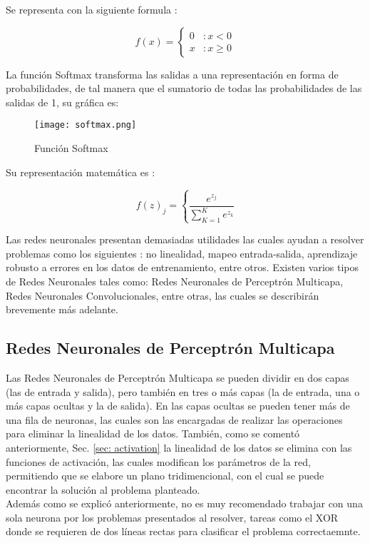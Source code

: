                 Se representa con la siguiente formula \cite{Freire2021}: 

                \[f(x) = \left\{ \begin{array}{lr} 0 & : x < 0\\ x & : x \ge 0 \end{array} \right. \]

                La función Softmax transforma las salidas a una representación en forma de 
                probabilidades, de tal manera que el sumatorio de todas las probabilidades 
                de las salidas de 1, su gr\'afica es: \label{subsec: softmax}

                \begin{figure}[H]
                    \centering
                    \texttt{[image: softmax.png]}
                    \caption{Funci\'on Softmax}
                    \label{fig:fig7}
                \end{figure}

                Su representaci\'on matem\'atica es \cite{calvo-2018}:

                \[f(z)_j = \left\{ \frac{e^{z_j}}{\sum_{K=1}^{K} e^{z_k}} \right. \]

        Las redes neuronales presentan demasiadas utilidades las cuales ayudan a resolver problemas como los 
        siguientes \cite{liu2015}: no linealidad, mapeo entrada-salida, aprendizaje robusto 
        a errores en los datos de entrenamiento, entre otros.  Existen varios tipos de Redes Neuronales tales como: Redes Neuronales de Perceptr\'on 
        Multicapa, Redes Neuronales Convolucionales, entre otras, las cuales se describirán brevemente más adelante.
    
        \subsection{Redes Neuronales de Perceptr\'on Multicapa}
        
            Las Redes Neuronales de Perceptr\'on Multicapa se pueden dividir en dos capas (las de entrada y salida), pero también en tres o más capas (la de entrada, una o más capas ocultas y la de salida).  En las capas ocultas se pueden 
            tener m\'as de una fila de neuronas, las cuales son las encargadas de realizar las operaciones para eliminar 
            la linealidad de los datos.  También, como se comentó anteriormente,  Sec. \eqref{sec: activation} la linealidad de los datos se elimina 
            con las funciones de activaci\'on,  las cuales modifican los parámetros de la red,  permitiendo que se elabore un plano tridimencional,  
            con el cual se puede encontrar la soluci\'on al problema planteado.\\
            Adem\'as como se explicó anteriormente, no es muy recomendado trabajar con una sola 
            neurona por los problemas presentados al resolver, tareas como el XOR donde se requieren de dos líneas rectas para clasificar el problema correctaemnte.

